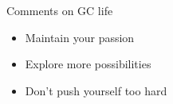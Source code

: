 \begin{frame}[fragile]{Comments on GC life}
	\begin{itemize}
		\item Maintain your passion
		\item Explore more possibilities
		\item Don't push yourself too hard
	\end{itemize}
\end{frame}

